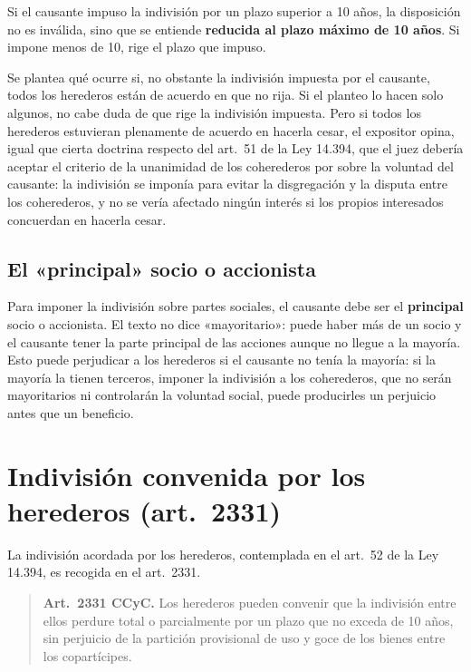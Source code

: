 \documentclass[12pt,oneside]{book}
\begin{document}
Si el causante impuso la indivisión por un plazo superior a 10 años, la disposición no es inválida, sino que se entiende \textbf{reducida al plazo máximo de 10 años}. Si impone menos de 10, rige el plazo que impuso.

Se plantea qué ocurre si, no obstante la indivisión impuesta por el causante, todos los herederos están de acuerdo en que no rija. Si el planteo lo hacen solo algunos, no cabe duda de que rige la indivisión impuesta. Pero si todos los herederos estuvieran plenamente de acuerdo en hacerla cesar, el expositor opina, igual que cierta doctrina respecto del art.~51 de la Ley 14.394, que el juez debería aceptar el criterio de la unanimidad de los coherederos por sobre la voluntad del causante: la indivisión se imponía para evitar la disgregación y la disputa entre los coherederos, y no se vería afectado ningún interés si los propios interesados concuerdan en hacerla cesar.

\subsection{El «principal» socio o accionista}

Para imponer la indivisión sobre partes sociales, el causante debe ser el \textbf{principal} socio o accionista. El texto no dice «mayoritario»: puede haber más de un socio y el causante tener la parte principal de las acciones aunque no llegue a la mayoría. Esto puede perjudicar a los herederos si el causante no tenía la mayoría: si la mayoría la tienen terceros, imponer la indivisión a los coherederos, que no serán mayoritarios ni controlarán la voluntad social, puede producirles un perjuicio antes que un beneficio.

\section{Indivisión convenida por los herederos (art.~2331)}

La indivisión acordada por los herederos, contemplada en el art.~52 de la Ley 14.394, es recogida en el art.~2331.

\begin{quote}
\textbf{Art.~2331 CCyC.} Los herederos pueden convenir que la indivisión entre ellos perdure total o parcialmente por un plazo que no exceda de 10 años, sin perjuicio de la partición provisional de uso y goce de los bienes entre los copartícipes.
\end{quote}
\end{document}
